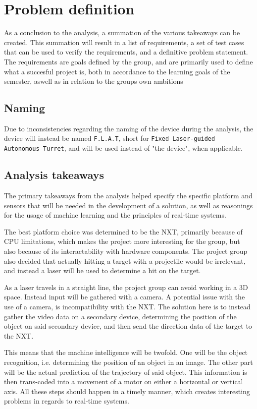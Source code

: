 \newpage
\section{Problem definition}
As a conclusion to the analysis, a summation of the various takeaways can be created.
This summation will result in a list of requirements, a set of test cases that can be used to verify the requirements, and a definitive problem statement.
The requirements are goals defined by the group, and are primarily used to define what a succesful project is, both in accordance to the learning goals of the semester, aswell as in relation to the groups own ambitions

\subsection{Naming}
Due to inconsistencies regarding the naming of the device during the analysis, the device will instead be named \texttt{F.L.A.T}, short for \texttt{Fixed Laser-guided Autonomous Turret}, and will be used instead of "the device", when applicable.

\subsection{Analysis takeaways}
The primary takeaways from the analysis helped specify the specific platform and sensors that will be needed in the development of a solution, as well as reasonings for the usage of machine learning and the principles of real-time systems.

The best platform choice was determined to be the NXT, primarily because of CPU limitations, which makes the project more interesting for the group, but also because of its interactability with hardware components.
The project group also decided that actually hitting a target with a projectile would be irrelevant, and instead a laser will be used to determine a hit on the target.

As a laser travels in a straight line, the project group can avoid working in a 3D space.
Instead input will be gathered with a camera.
A potential issue with the use of a camera, is incompatibility with the NXT.
The solution here is to instead gather the video data on a secondary device, determining the position of the object on said secondary device, and then send the direction data of the target to the NXT.

This means that the machine intelligence will be twofold.
One will be the object recognition, i.e. determining the position of an object in an image.
The other part will be the actual prediction of the trajectory of said object.
This information is then trans-coded into a movement of a motor on either a horizontal or vertical axis.
All these steps should happen in a timely manner, which creates interesting problems in regards to real-time systems.

